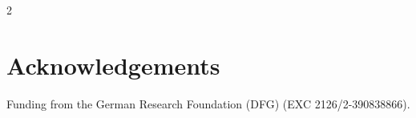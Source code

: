 \documentclass[a0,portrait]{a0poster}
\begin{document}
\begin{multicols*}{2}
\color{UoCGray}
\section*{Acknowledgements}
\color{Black}
Funding from the German Research Foundation (DFG) (EXC 2126/2-390838866).

\end{multicols*}
\end{document}
